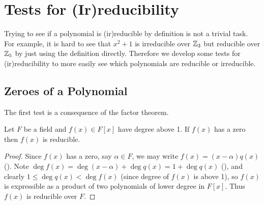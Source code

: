 \section{Tests for (Ir)reducibility}
Trying to see if a polynomial is (ir)reducible by definition is not a trivial task. For example, it is hard to see that $x^2 + 1$ is irreducible over $\mathbb{Z}_3$ but reducible over $\mathbb{Z}_5$ by just using the definition directly. Therefore we develop some tests for (ir)reducibility to more easily see which polynomials are reducible or irreducible.

\subsection{Zeroes of a Polynomial}
The first test is a consequence of the factor theorem.
\begin{theorem}\label{thrm-degree-above-1-reducible-if-has-zero}
    Let $F$ be a field and $f(x) \in F[x]$ have degree above 1. If $f(x)$ has a zero then $f(x)$ is reducible.
\end{theorem}
\begin{proof}
    Since $f(x)$ has a zero, say $\alpha \in F$, we may write $f(x) = (x-\alpha)q(x)$ (). Note $\deg f(x) = \deg(x-\alpha) + \deg q(x) = 1 + \deg q(x)$ (), and clearly $1 \leq \deg q(x) < \deg f(x)$ (since degree of $f(x)$ is above 1), so $f(x)$ is expressible as a product of two polynomials of lower degree in $F[x]$. Thus $f(x)$ is reducible over $F$. 
\end{proof}


